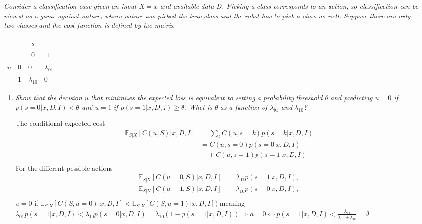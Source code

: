 \begin{example}
	\emph{Consider a classification case given an input $X=x$ and available data $D$. Picking a class corresponds to an action, so classification can be viewed as a game against nature, where nature has picked the true class and the robot has to pick a class as well. Suppose there are only two classes and the cost function is defined by the matrix}
	\begin{center}
		\begin{tabular}{ c  c  c  c }
			&& $s$& \\
			&& $0$ & $1$  \\
			\cline{3-4}
			$u$ & 0& \multicolumn{1}{|l}{$0$} &\multicolumn{1}{l|}{$\lambda_{01}$}  \\
			& 1& \multicolumn{1}{|l}{$\lambda_{10}$} & \multicolumn{1}{l|}{0} \\
			\cline{3-4}
		\end{tabular}
	\end{center}
	\begin{enumerate}
		\item \emph{Show that the decision $u$ that minimizes the expected loss is equivalent to setting a probability threshold $\theta$ and predicting $u=0$ if $p(s=0|x,D,I) < \theta$ and $u=1$ if $p(s=1|x,D,I)\geq \theta$. What is $\theta$ as a function of $\lambda_{01}$ and $\lambda_{10}$?}\newline
		
		The conditional expected cost
		\begin{equation}
			\begin{split}
				\mathbb{E}_{S|X}[C(u, S)|x,D,I] & = \sum_kC(u,s=k)p(s=k|x,D,I)\\
				& = C(u,s=0)p(s=0|x,D,I)\\
				& \quad+C(u,s=1)p(s=1|x,D,I)\\
			\end{split}
		\end{equation}
		For the different possible actions
		\begin{equation}
			\begin{split}
				\mathbb{E}_{S|X}[C(u= 0, S)|x,D,I] &= \lambda_{01}p(s=1|x,D,I),\\
				\mathbb{E}_{S|X}[C(u= 1, S)|x,D,I] &= \lambda_{10}p(s=0|x,D,I),\\
			\end{split}
		\end{equation}
		$u=0$ if $\mathbb{E}_{S|X}[C(S,u= 0)|x,D,I]<\mathbb{E}_{S|X}[C(S,u= 1)|x,D,I])$ meaning $\lambda_{01}p(s=1|x,D,I)<\lambda_{10}p(s=0|x,D,I)=\lambda_{10}(1-p(s=1|x,D,I))\Rightarrow a=0 \iff p(s=1|x,D,I)<\frac{\lambda_{10}}{\lambda_{01}+\lambda_{10}}=\theta$.
		

\end{enumerate}
\end{example}
